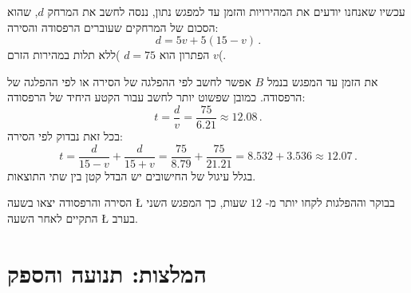 עכשיו שאנחנו יודעים את המהירויות והזמן עד למפגש נתון, ננסה לחשב את המרחק 
$d$,
שהוא הסכום של המרחקים שעוברים הרפסודה והסירה:
\[
d = 5v + 5(15-v)\,.
\]
הפתרון הוא
$d=75$
)ללא תלות במהירות הזרם
$v$(.

\smallskip

את הזמן עד המפגש בנמל 
$B$
אפשר לחשב לפי ההפלגה של הסירה או לפי ההפלגה של הרפסודה. כמובן שפשוט יותר לחשב עבור הקטע היחיד של הרפסודה:
\[
t = \frac{d}{v} = \frac{75}{6.21} \approx 12.08\,.
\]
בכל זאת נבדוק לפי הסירה:
\[
t = \frac{d}{15-v} + \frac{d}{15+v} = \frac{75}{8.79} + \frac{75}{21.21}= 8.532 + 3.536 \approx 12.07\,.
\]
בגלל עיגול של החישובים יש הבדל קטן בין שתי התוצאות.

הסירה והרפסודה יצאו בשעה
\L{}
בבוקר וההפלגות לקחו יותר מ-%
$12$
שעות, כך המפגש השני התקיים לאחר השעה
\L{}
בערב.



\clearpage
{}


\section{המלצות: תנועה והספק}


